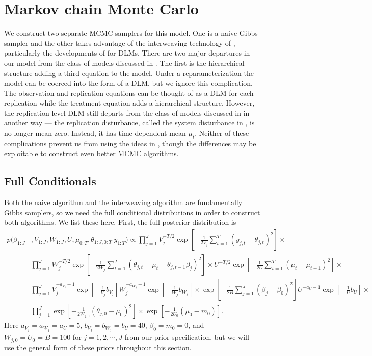 \documentclass[graybox]{svmult}
\begin{document}
\section{Markov chain Monte Carlo}\label{sec:MCMC}
We construct two separate MCMC samplers for this model. One is a naive Gibbs sampler and the other takes advantage of the interweaving technology of \citet{yu2011center}, particularly the developments of \citet{simpson2014interweaving} for DLMs. There are two major departures in our model from the class of models discussed in \citet{simpson2014interweaving}. The first is the hierarchical structure adding a third equation to the model. Under a reparameterization the model can be coerced into the form of a DLM, but we ignore this complication. The observation and replication equations can be thought of as a DLM for each replication while the treatment equation adds a hierarchical structure. However, the replication level DLM still departs from the class of models discussed in \citet{simpson2014interweaving} in another way --- the replication disturbance, called the system disturbance in \citet{simpson2014interweaving}, is no longer mean zero. Instead, it has time dependent mean $\mu_t$. Neither of these complications prevent us from using the ideas in \citet{simpson2014interweaving}, though the differences may be exploitable to construct even better MCMC algorithms.

\subsection{Full Conditionals}\label{sec:fullconds}

Both the naive algorithm and the interweaving algorithm are fundamentally Gibbs samplers, so we need the full conditional distributions in order to construct both algorithms. We list these here. First, the full posterior distribution is 
\begin{align*}
p(\beta_{1:J}&,V_{1:J},W_{1:J},U,\mu_{0:T},\theta_{1:J,0:T}|y_{1:T}) \propto \prod_{j=1}^JV_j^{-T/2}\exp\left[-\frac{1}{2V_j}\sum_{t=1}^T(y_{j,t} - \theta_{j,t})^2\right]\times \\
&\prod_{j=1}^JW_j^{-T/2}\exp\left[-\frac{1}{2W_j}\sum_{t=1}^T(\theta_{j,t} - \mu_t - \theta_{j,t-1}\beta_j)^2\right]\times U^{-T/2}\exp\left[-\frac{1}{2U}\sum_{t=1}^T(\mu_t - \mu_{t-1})^2\right]\times \\
&\prod_{j=1}^JV_j^{-a_{V_j} - 1}\exp\left[-\frac{1}{V_j}b_{V_j}\right]W_j^{-a_{W_j} - 1}\exp\left[-\frac{1}{W_j}b_{W_j}\right]\times \exp\left[-\frac{1}{2B}\sum_{j=1}^J(\beta_j-\beta_0)^2\right]U^{-a_U-1}\exp\left[-\frac{1}{U}b_U\right]\times\\
&\prod_{j=1}^J\exp\left[-\frac{1}{2W_{j,0}}(\theta_{j,0}-\mu_0)^2\right]\times \exp\left[-\frac{1}{2U_0}(\mu_0-m_0)\right].
\end{align*}
Here $a_{V_j}=a_{W_j}=a_U=5$, $b_{V_j}=b_{W_j}=b_U=40$, $\beta_0=m_0=0$, and $W_{j,0}=U_0=B=100$ for $j=1,2,\cdots,J$ from our prior specification, but we will use the general form of these priors throughout this section.
\end{document}
